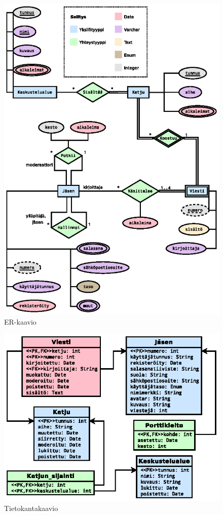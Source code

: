 \documentclass[11pt]{article}
\begin{document}
		\newpage
		\thispagestyle{plain}
		\begin{figure}[H]		
			\includegraphics[trim = 6mm 0mm 0mm 20mm, scale = 1.5]{er-kaavio.eps}
			\caption{ER-kaavio}
		\end{figure}
		
		\newpage
		\thispagestyle{plain}
		\begin{figure}[H]		
			\includegraphics[trim = 0mm 0mm 0mm 20mm, scale = 1.5]{uml-tietokantakaavio.eps}
			\caption{Tietokantakaavio}
		\end{figure}
		
\end{document}
